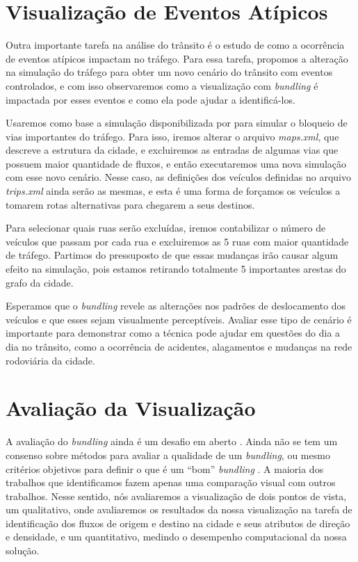 \section{Visualização de Eventos Atípicos}
\label{sec:vis-eventos}

  Outra importante tarefa na análise do trânsito é o estudo de como a
ocorrência de eventos atípicos impactam no tráfego. Para essa tarefa, propomos
a alteração na simulação do tráfego para obter um novo cenário do trânsito com
eventos controlados, e com isso observaremos como a visualização com \emph{bundling}
é impactada por esses eventos e como ela pode ajudar a identificá-los.

  Usaremos como base a simulação disponibilizada  por \citet{mabs2017} para
simular o bloqueio de vias importantes do tráfego. Para isso, iremos alterar o
arquivo \emph{maps.xml}, que descreve a estrutura da cidade, e excluiremos as
entradas de algumas vias que possuem maior quantidade de fluxos, e então
executaremos uma nova simulação com esse novo cenário. Nesse caso, as
definições dos veículos definidas no arquivo \emph{trips.xml} ainda serão as
mesmas, e esta é uma forma de forçamos os veículos a tomarem rotas alternativas
para chegarem a seus destinos.

 Para selecionar quais ruas serão excluídas, iremos contabilizar o
número de veículos que passam por cada rua e excluiremos as 5 ruas com maior
quantidade de tráfego. Partimos do pressuposto de que essas mudanças irão
causar algum efeito na simulação, pois estamos retirando totalmente 5
importantes arestas do grafo da cidade.

  Esperamos que o \emph{bundling} revele as alterações nos padrões de
deslocamento dos veículos e que esses sejam visualmente perceptíveis. Avaliar
esse tipo de cenário é importante para demonstrar como a técnica pode ajudar em
questões do dia a dia no trânsito, como a ocorrência de acidentes, alagamentos
e mudanças na rede rodoviária da cidade.

\section{Avaliação da Visualização} 
  A avaliação do \emph{bundling} ainda é um desafio em aberto
\citep{Telea2018}.  Ainda não se tem um consenso sobre métodos para avaliar a
qualidade de um \emph{bundling}, ou mesmo critérios objetivos para definir o
que é um ``bom'' \emph{bundling} \citep{Lhuillier2017}.  A maioria dos
trabalhos que identificamos fazem apenas uma comparação visual com outros
trabalhos. Nesse sentido, nós avaliaremos a visualização de dois pontos de
vista, um qualitativo, onde avaliaremos os resultados da nossa visualização
na tarefa de identificação dos fluxos de origem e destino na cidade e seus atributos
de direção e densidade, e um quantitativo, medindo o desempenho computacional
da nossa solução.

